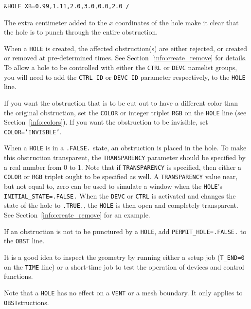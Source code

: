 \documentclass[11pt]{book}
\newcommand{\ct}{\tt\small}
\begin{document}
\footnotesize
\begin{verbatim}
&HOLE XB=0.99,1.11,2.0,3.0,0.0,2.0 /
\end{verbatim}
\normalsize
The extra centimeter added to the $x$ coordinates of the hole make it clear
that the hole is to punch through the entire obstruction.

When a {\ct HOLE} is created, the affected obstruction(s) are either rejected, or
created or removed at pre-determined times. See Section~\ref{info:create_remove} for details.
To allow a hole to be controlled with either the {\ct CTRL} or {\ct DEVC} namelist groups, you will need to add the {\ct CTRL\_ID} or {\ct DEVC\_ID}
parameter respectively, to the {\ct HOLE} line.

If you want the obstruction that is to be cut out to have a different color
than the original obstruction, set the {\ct COLOR} or integer triplet
{\ct RGB} on the {\ct HOLE} line (see Section~\ref{info:colors}). If you want the obstruction to be invisible, set {\ct COLOR='INVISBLE'}.

When a {\ct HOLE} is in a {\ct .FALSE.} state, an obstruction is placed in the hole.
To make this obstruction transparent, the {\ct TRANSPARENCY} parameter should be specified by
a real number from 0 to 1. Note that if {\ct TRANSPARENCY} is specified, then either a {\ct COLOR} or {\ct RGB} triplet ought to be specified as well.
A {\ct TRANSPARENCY} value near, but not equal to, zero can be used to simulate a window when the {\ct HOLE}'s {\ct INITIAL\_STATE=.FALSE.} When the {\ct DEVC} or {\ct CTRL}
is activated and changes the state of the hole to {\ct .TRUE.}, the {\ct HOLE} is then open and completely transparent.
See Section~\ref{info:create_remove} for an example.

If an obstruction is not to be punctured by a {\ct HOLE}, add
{\ct PERMIT\_HOLE=.FALSE.} to the {\ct OBST} line.

\begin{warning}
\noindent
It is a good idea to inspect the geometry by running either a setup job
({\ct T\_END=0} on the {\ct TIME} line) or a short-time job to test the operation of devices and control functions.
\end{warning}

\begin{warning}
\noindent
Note that a {\ct HOLE} has no effect on a {\ct VENT} or a mesh boundary. It only applies to {\ct OBST}structions.
\end{warning}


\newpage
\end{document}
